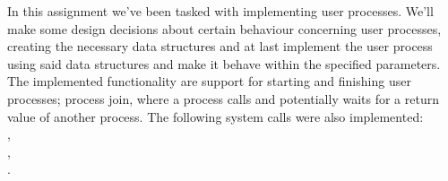 \noindent In this assignment we've been tasked with implementing user processes. We'll
make some design decisions about certain behaviour concerning user processes, 
creating the necessary data structures and at last implement the user process
using said data structures and make it behave within the specified parameters.\\
\noindent The implemented functionality are support for starting and finishing 
user processes; process join, where a process calls and potentially waits for a 
return value of another process. The following system calls were also
implemented:\\,\\
              ,\\
              .
